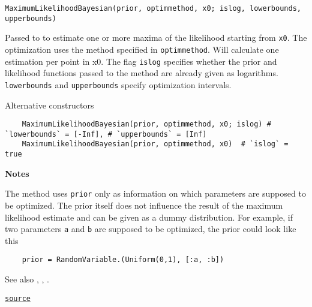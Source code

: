 \begin{adjustwidth}{2em}{0pt}


\begin{verbatim}
MaximumLikelihoodBayesian(prior, optimmethod, x0; islog, lowerbounds, upperbounds)
\end{verbatim}

Passed to  to estimate one or more maxima of the likelihood starting from \texttt{x0}. The optimization uses the method specified in \texttt{optimmethod}. Will calculate one estimation per point in x0. The flag \texttt{islog} specifies whether the prior and likelihood functions passed to the   method are already  given as logarithms. \texttt{lowerbounds} and \texttt{upperbounds} specify optimization intervals.

Alternative constructors


\begin{verbatim}
    MaximumLikelihoodBayesian(prior, optimmethod, x0; islog) # `lowerbounds` = [-Inf], # `upperbounds` = [Inf]
    MaximumLikelihoodBayesian(prior, optimmethod, x0)  # `islog` = true
\end{verbatim}

\textbf{Notes}

The method uses \texttt{prior} only as information on which parameters are supposed to be optimized. The prior itself does not influence the result of the maximum likelihood estimate and can be given as a dummy distribution. For example, if two parameters \texttt{a} and \texttt{b} are supposed to be optimized, the prior could look like this


\begin{verbatim}
    prior = RandomVariable.(Uniform(0,1), [:a, :b])
\end{verbatim}

See also , ,  .



\href{https://github.com/friesischscott/UncertaintyQuantification.jl/blob/f5ee6cce729f0d6a57979257379c942cdf42f86f/src/modelupdating/bayesianMAP.jl#L52-L70}{\texttt{source}}


\end{adjustwidth}

